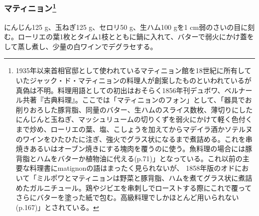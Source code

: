 \begin{recette}
{\subsubsection[マティニョン]{\texorpdfstring{マティニョン\footnote{1935年以来首相官邸として使われているマティニョン館を18世紀に所有していたジャック・ド・マティニョンの料理人が創案したものといわれているが真偽は不明。料理用語としての初出はおそらく1856年刊デュボワ、ベルナール共著『古典料理』。ここでは「マティニョンのフォン」として、「器具でお削りおろした豚背脂、同量のバター、生ハムのスライス数枚、薄切りにしたにんじんと玉ねぎ、マッシュリュームの切りくずを弱火にかけて軽く色付くまで炒め、ローリエの葉、塩、こしょうを加えてからマデイラ酒かソテルヌのワインをひたひたに注ぎ、強火でグラス状になるまで煮詰める。これを串焼きあるいはオーブン焼きにする塊肉を覆うのに使う。魚料理の場合には豚背脂とハムをバターか植物油に代える(p.71)」となっている。これ以前の主要な料理書にmatignonの語はまったく見られないが、
  1858年版のオドにおいて「ミルポワとマティニョンは野菜と豚背脂、ハムを煮てグラス状に煮詰めたガルニチュール。鶏やジビエを串刺しでローストする際にこれで覆ってさらにバターを塗った紙で包む。高級料理でしかほとんど用いられない(p.167)」とされている。}}{マティニョン}}\label{matignon}}


 

にんじん125 g、玉ねぎ125 g、セロリ50 g、生ハム100 gを1
cm弱のさいの目に刻む。ローリエの葉1枚とタイム1枝とともに鍋に入れて、バターで弱火にかけ蓋をして蒸し煮し、少量の白ワインでデグラセする。

\atoaki{}

\hypertarget{mirepoix}{%
}
\end{recette}

